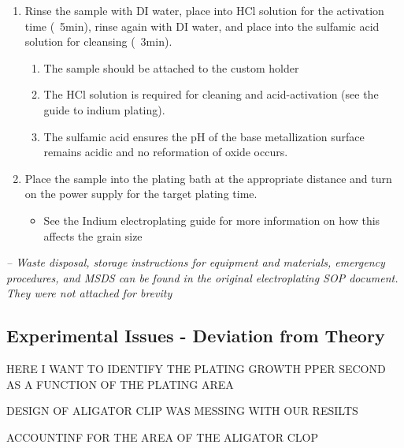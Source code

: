 \begin{center}
\begin{framed}
\begin{minipage}{0.8\textwidth}
\begin{enumerate}
            \item Rinse the sample with DI water, place into HCl solution for the activation time (~5min), rinse again with DI water, and place into the sulfamic acid solution for cleansing (~3min).
            \begin{enumerate}
                \item The sample should be attached to the custom holder
                \item The HCl solution is required for cleaning and acid-activation (see the guide to indium plating).
                \item The sulfamic acid ensures the pH of the base metallization surface remains acidic and no reformation of oxide occurs.
            \end{enumerate}

            \item Place the sample into the plating bath at the appropriate distance and turn on the power supply for the target plating time.
            \begin{itemize}
                \item See the Indium electroplating guide for more information on how this affects the grain size
            \end{itemize}
        \end{enumerate}


        \vspace{0.5cm} %

        \textit{-- Waste disposal, storage instructions for equipment and materials, emergency procedures, and MSDS can be found in the original electroplating SOP document. They were not attached for brevity }

        \end{minipage}
    \end{framed}
\end{center}


\subsection{Experimental Issues - Deviation from Theory}


HERE I WANT TO IDENTIFY THE PLATING GROWTH PPER SECOND AS A FUNCTION OF THE PLATING AREA

DESIGN OF ALIGATOR CLIP WAS MESSING WITH OUR RESILTS

ACCOUNTINF FOR THE AREA OF THE ALIGATOR CLOP

